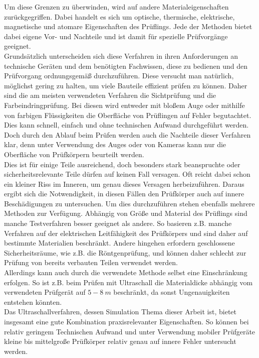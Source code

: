 \documentclass[reducespace,stylepage,semiarbeit]{spezidoc}
\begin{document}
Um diese Grenzen zu überwinden, wird auf andere Materialeigenschaften zurückgegriffen.
Dabei handelt es sich um optische, thermische, elektrische, magnetische und atomare Eigenschaften des Prüflings. 
Jede der Methoden bietet dabei eigene Vor- und Nachteile und ist damit für spezielle Prüfvorgänge geeignet. \\ 
Grundsätzlich unterscheiden sich diese Verfahren in ihren Anforderungen an technische Geräten und dem benötigten Fachwissen, diese zu bedienen und den Prüfvorgang ordnungsgemäß durchzuführen. 
Diese versucht man natürlich, möglichst gering zu halten, um viele Bauteile effizient prüfen zu können.
Daher sind die am meisten verwendeten Verfahren die Sichtprüfung und die Farbeindringprüfung. 
Bei diesen wird entweder mit bloßem Auge oder mithilfe von farbigen Flüssigkeiten die Oberfläche von Prüflingen auf Fehler begutachtet. 
Dies kann schnell, einfach und ohne technischen Aufwand durchgeführt werden.
Doch durch den Ablauf beim Prüfen werden auch die Nachteile dieser Verfahren klar, denn unter Verwendung des Auges oder von Kameras kann nur die Oberfläche von Prüfkörpern beurteilt werden. \\
Dies ist für einige Teile ausreichend, doch besonders stark beanspruchte oder sicherheitsrelevante Teile dürfen auf keinen Fall versagen. 
Oft reicht dabei schon ein kleiner Riss im Inneren, um genau dieses Versagen herbeizuführen. 
Daraus ergibt sich die Notwendigkeit, in diesen Fällen den Prüfkörper auch auf innere Beschädigungen zu untersuchen.
Um dies durchzuführen stehen ebenfalls mehrere Methoden zur Verfügung.
Abhängig von Größe und Material des Prüflings sind manche Testverfahren besser geeignet als andere. 
So basieren z.B. manche Verfahren auf der elektrischen Leitfähigkeit des Prüfkörpers und sind daher auf bestimmte Materialien beschränkt.
Andere hingehen erfordern geschlossene Sicherheitsräume, wie z.B. die Röntgenprüfung, und können daher schlecht zur Prüfung von bereits verbauten Teilen verwendet werden.\\
Allerdings kann auch durch die verwendete Methode selbst eine Einschränkung erfolgen. So ist z.B. beim Prüfen mit Ultraschall die Materialdicke abhängig vom verwendeten Prüfgerät auf $5 - 8~m$ beschränkt, da sonst Ungenauigkeiten entstehen könnten.\\
Das Ultraschallverfahren, dessen Simulation Thema dieser Arbeit ist, bietet insgesamt eine gute Kombination praxisrelevanter
 Eigenschaften. So können bei relativ geringem Technischen Aufwand und unter Verwendung mobiler Prüfgeräte kleine bis mittelgroße Prüfkörper relativ genau auf innere Fehler untersucht werden.
\end{document}
